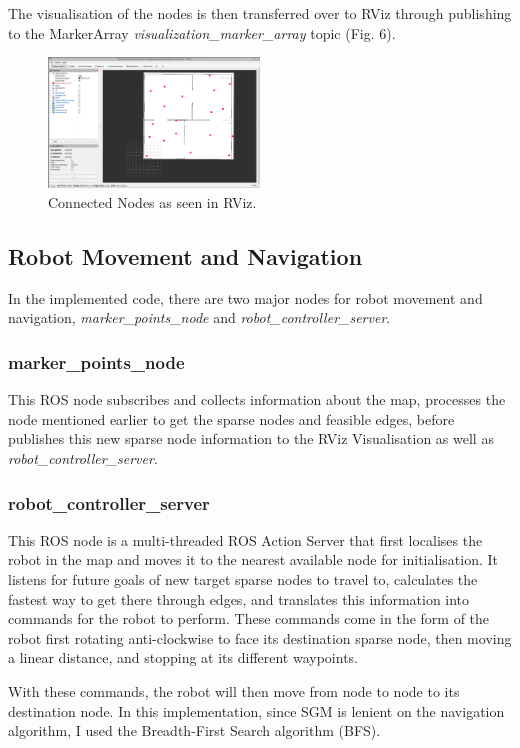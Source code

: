 \documentclass[conference]{IEEEtran}
\begin{document}
The visualisation of the nodes is then transferred over to RViz through publishing to the MarkerArray \textit{visualization\_marker\_array} topic (Fig. 6).
\begin{figure}[h]
  \centering
  \includegraphics[width=0.5\textwidth]{../assets/map_nodes_3.png}
  \caption{Connected Nodes as seen in RViz.}
  \label{fig:example}
\end{figure}

\subsection{Robot Movement and Navigation}
In the implemented code, there are two major nodes for robot movement and navigation, \textit{marker\_points\_node} and \textit{robot\_controller\_server}.

\subsubsection{marker\_points\_node}
This ROS node subscribes and collects information about the map, processes the node mentioned earlier to get the sparse nodes and feasible edges, before publishes this new sparse node information to the RViz Visualisation as well as \textit{robot\_controller\_server}.

\subsubsection{robot\_controller\_server}
This ROS node is a multi-threaded ROS Action Server that first localises the robot in the map and moves it to the nearest available node for initialisation. It listens for future goals of new target sparse nodes to travel to, calculates the fastest way to get there through edges, and translates this information into commands for the robot to perform. These commands come in the form of the robot first rotating anti-clockwise to face its destination sparse node, then moving a linear distance, and stopping at its different waypoints.

With these commands, the robot will then move from node to node to its destination node. In this implementation, since SGM is lenient on the navigation algorithm, I used the Breadth-First Search algorithm (BFS).
\end{document}

